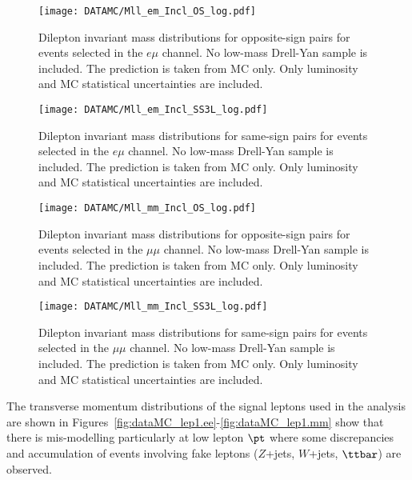 \begin{figure}[htb!]
\centering
{\texttt{[image: DATAMC/Mll\_em\_Incl\_OS\_log.pdf]}}
\caption{Dilepton invariant mass distributions for opposite-sign pairs for events selected in the $e\mu$ channel. 
No low-mass Drell-Yan sample is included. 
 The prediction is taken from MC only.
Only luminosity and MC statistical uncertainties are included.
}
\label{fig:dataMC_2em.os}
\end{figure}


\begin{figure}[htb!]
\centering
{\texttt{[image: DATAMC/Mll\_em\_Incl\_SS3L\_log.pdf]}}
\caption{Dilepton invariant mass distributions for same-sign pairs for events selected in the $e\mu$ channel. 
No low-mass Drell-Yan sample is included. 
 The prediction is taken from MC only.
Only luminosity and MC statistical uncertainties are included.
}
\label{fig:dataMC_2em.ss}
\end{figure}


\begin{figure}[htb!]
\centering
{\texttt{[image: DATAMC/Mll\_mm\_Incl\_OS\_log.pdf]}}
\caption{Dilepton invariant mass distributions for opposite-sign pairs for events selected in the $\mu\mu$ channel. 
No low-mass Drell-Yan sample is included. 
 The prediction is taken from MC only.
Only luminosity and MC statistical uncertainties are included.
}
\label{fig:dataMC_2mm.os}
\end{figure}


\begin{figure}[htb!]
\centering
{\texttt{[image: DATAMC/Mll\_mm\_Incl\_SS3L\_log.pdf]}}
\caption{Dilepton invariant mass distributions for same-sign pairs for events selected in the $\mu\mu$ channel. 
No low-mass Drell-Yan sample is included. 
 The prediction is taken from MC only.
Only luminosity and MC statistical uncertainties are included.
}
\label{fig:dataMC_2mm.ss}
\end{figure}

The transverse momentum distributions of the signal leptons used in the analysis are shown in 
Figures~\ref{fig:dataMC_lep1.ee}-\ref{fig:dataMC_lep1.mm} show that there is mis-modelling particularly at low
lepton $\pt$ where some discrepancies and accumulation of events involving fake leptons ($Z$+jets, $W$+jets, $\ttbar$) are observed. 

